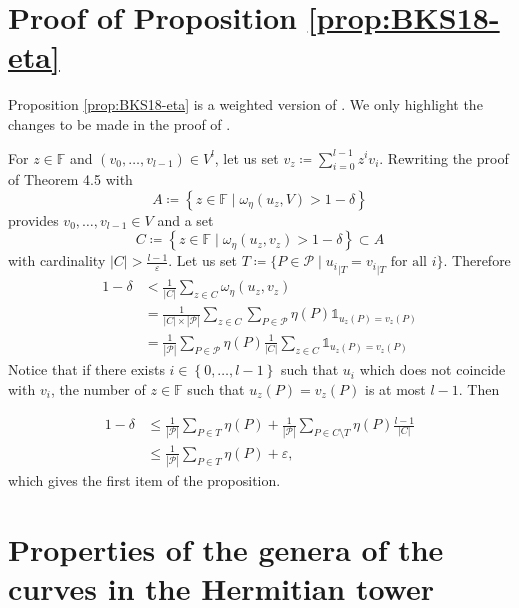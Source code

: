 \documentclass[a4paper,USenglish,autoref]{lipics-v2021}
\renewcommand\epsilon{\varepsilon}
\newcommand\F{\mathbb{F}}
\def\rest#1#2{{{#1}_{|#2}}}
\newcommand{\set}[1]{\left\{#1\right\}}
\newcommand{\range}[1]{\set{0,\dots,#1-1}}
\newcommand\calP{\mathcal{P}}
\newcommand\mydef{\coloneqq}
\begin{document}
%
%
%

%



\appendix

\section{Proof of Proposition \ref{prop:BKS18-eta}}\label{app:prop-ldc}

Proposition \ref{prop:BKS18-eta} is a weighted version of \cite[Theorem~4.5]{BKS18}. We only highlight the changes to be made in the proof of \cite[Theorem~4.5]{BKS18}.

For $z \in \F$ and $(v_0,\dots,v_{l-1}) \in V^l$, let us set $\displaystyle{v_z \mydef \sum_{i = 0}^{l - 1} z^i v_i}$. Rewriting the proof of Theorem 4.5 \cite{BKS18} with
\[A \mydef\left\{z\in \F \mid \omega_\eta\left(u_z, V\right)>1-\delta \right\}\]
provides $v_0, \ldots, v_{l-1} \in V$ and a set
\[C\mydef \left\{z \in \F \mid \omega_\eta\left(u_z,v_z \right) > 1-\delta\right\} \subset A \]
with cardinality $|C| > \frac{l-1}{\epsilon}$. Let us set $T\mydef \{P \in \calP \mid \rest{u_i}{T}=\rest{v_i}{T} \text{ for all } i\}$. Therefore
\begin{align*}
	1-\delta &< \frac{1}{|C|} \sum_{z \in C} \omega_\eta\left(u_z, v_z\right)\\
	& =\frac{1}{|C|\times |\calP|} \sum_{z \in C} \sum_{P \in \calP} \eta(P) \mathds{1}_{u_z(P) = v_z(P)}\\
	& =\frac{1}{|\calP|} \sum_{P \in \calP} \eta(P) \frac{1}{|C|} \sum_{z \in C}  \mathds{1}_{u_z(P) = v_z(P)}
\end{align*}
Notice that if there exists $i \in\range{l}$ such that $u_i$ which does not coincide with $v_i$, the number of $z \in \F$ such that $u_z(P)= v_z(P)$ is at most $l-1$. Then 

\begin{align*}
	1-\delta & \leq \frac{1}{|\calP|} \sum_{P \in T} \eta(P) + \frac{1}{|\calP|} \sum_{P \in C\setminus T} \eta(P) \frac{l-1}{|C|}\\
	& \leq \frac{1}{|\calP|} \sum_{P \in T} \eta(P) + \epsilon,
\end{align*}
which gives the first item of the proposition.


\section{Properties of the genera of the curves in the Hermitian tower}\label{app:gen_HT}
\end{document}
